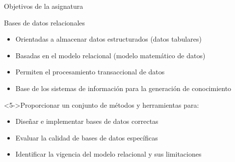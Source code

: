 \begin{frame}{Objetivos de la asignatura}
    \begin{block}{Bases de datos relacionales}
        \begin{itemize}
            \item<1-> Orientadas a almacenar datos estructurados (datos tabulares)
            \item<2-> Basadas en el modelo relacional (modelo matem\'atico de datos)
            \item<3-> Permiten el procesamiento transaccional de datos
            \item<4-> Base de los sistemas de informaci\'on para la generaci\'on de conocimiento
        \end{itemize}
    \end{block}

    \begin{block}<5->{Proporcionar un conjunto de m\'etodos y herramientas para:}
        \begin{itemize}
            \item<6-> Dise\~nar e implementar bases de datos correctas
            \item<7-> Evaluar la calidad de bases de datos espec\'ificas
            \item<8-> Identificar la vigencia del modelo relacional y sus limitaciones
        \end{itemize}        
    \end{block}
\end{frame}